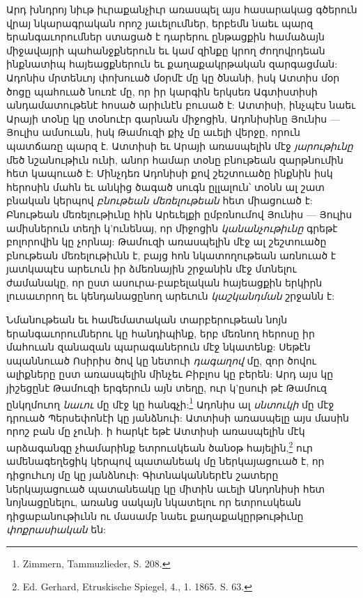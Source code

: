 \documentclass{article}
\begin{document}
{Արդ խնդրոյ նիւթ իւրաքանչիւր առասպել այս հասարակաց գծերուն վրայ նկարագրական որոշ յաւելումներ, երբեմն նաեւ պարզ երանգաւորումներ ստացած է դարերու ընթացքին համաձայն միջավայրի պահանջքներուն եւ կամ զինքը կրող ժողովրդեան ինքնատիպ հայեացքներուն եւ քաղաքակրթական զարգացման: Ադոնիս մրտենւոյ փոխուած մօրմէ մը կը ծնանի, իսկ Ատտիս մօր ծոցը պահուած նուռէ մը, որ իր կարգին երկսեռ Ագտիստիսի անդամատութենէ հոսած արիւնէն բուսած է: Ատտիսի, ինչպէս նաեւ Արայի տօնը կը տօնուէր գարնան միջոցին, Ադոնիսինը Յունիս — Յուլիս ամսուան, իսկ Թամուզի քիչ մը աւելի վերջը, որուն պատճառը պարզ է. Ատտիսի եւ Արայի առասպելին մէջ \emph{յարութիւնը} մեծ նշանութիւն ունի, անոր համար տօնը բնութեան զարթնումին հետ կապուած է: Մինչդեռ Ադոնիսի քով շեշտուածը ինքնին իսկ հերոսին մահն եւ անկից ծագած սուգն ըլլալուն՝ տօնն ալ շատ բնական կերպով \emph{բնութեան մեռելութեան} հետ միացուած է: Բնութեան մեռելութիւնը հին Արեւելքի ըմբռնումով Յունիս — Յուլիս ամիսներուն տեղի կ'ունենայ, որ միջոցին \emph{կանանչութիւնը} գրեթէ բոլորովին կը չորնայ: Թամուզի առասպելին մէջ ալ շեշտուածը բնութեան մեռելութիւնն է, բայց հոն նկատողութեան առնուած է յատկապէս արեւուն իր ձմեռնային շրջանին մէջ մտնելու ժամանակը, որ ըստ ասուրա-բաբելական հայեացքին երկիրն լուսաւորող եւ կենդանացընող արեւուն \emph{կաշկանդման} շրջանն է:

Նմանութեան եւ համեմատական տարբերութեան նոյն երանգաւորումներու կը հանդիպինք, երբ մեռնող հերոսը իր մահուան զանազան պարագաներուն մէջ նկատենք: Սեթէն սպաննուած Ոսիրիս ծով կը նետուի \emph{դագաղով} մը, զոր ծովու ալիքները ըստ առասպելին մինչեւ Բիբլոս կը բերեն: Արդ այս կը յիշեցընէ Թամուզի երգերուն այն տեղը, ուր կ'ըսուի թէ Թամուզ ընկղմուող \emph{նաւու} մը մէջ կը հանգչի:\footnote{Zimmern, Tammuzlieder, S. 208.} Ադոնիս ալ \emph{սնտուկի} մը մէջ դրուած Պերսեփոնէի կը յանձնուի: Ատտիսի առասպելը այս մասին որոշ բան մը չունի. ի հարկէ եթէ Ատտիսի առասպելին մէկ արձագանգը չհամարինք ետրուսկեան ծանօթ հայելին,\footnote{Ed. Gerhard, Etruskische Spiegel, 4., 1. 1865. S. 63.} ուր ամենագեղեցիկ կերպով պատանեակ մը ներկայացուած է, որ դիցուհւոյ մը կը յանձնուի: Գիտնականներէն շատերը ներկայացուած պատանեակը կը միտին աւելի Անդոնիսի հետ նոյնացընելու, առանց սակայն նկատելու որ ետրուսկեան դիցաբանութիւնն ու մասամբ նաեւ քաղաքակըրթութիւնը \emph{փոքրասիական} են:

}
\end{document}
